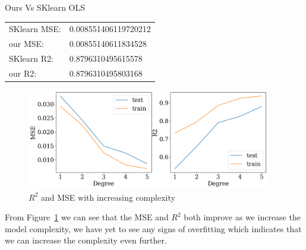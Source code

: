 \documentclass[twoside,11pt]{report}
\begin{document}
\begin{mytable}[float=h,label=tab:sklearnvsOurs, width=.5\textwidth]{Ours Vs SKlearn OLS}
\centering
\begin{tabular}{l l}
    SKlearn MSE: & 0.008551406119720212\\
    our MSE: & 0.00855140611834528\\
    SKlearn R2:&  0.8796310495615578\\
    our R2:&  0.8796310495803168
\end{tabular}%
\end{mytable}
\begin{figure}[!h]
    \begin{center}
        \includegraphics[width=0.95\textwidth]{../runsAndAdditions/R2andMSEOLS.png}
    \end{center}
    \caption{$R^2$ and MSE with increasing complexity}\label{fig:R2andMSEOLS}
\end{figure}
From Figure~\ref{fig:R2andMSEOLS} we can see that the MSE and $R^2$ both improve as we increase the model complexity, we have yet to see any signs of overfitting which indicates that we can increase the complexity even further.\\
\end{document}

